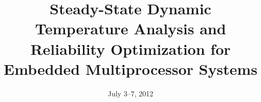 \documentclass{sig-alternate}
\begin{document}

  \title{Steady-State Dynamic Temperature Analysis and Reliability Optimization for Embedded Multiprocessor Systems}

  \author{}

  \date{July 3--7, 2012}

  \maketitle

  \begin{abstract}
    
  \end{abstract}




  

   \label{sec:preliminaries}
  

   \label{sec:problem}
  
\end{document}
